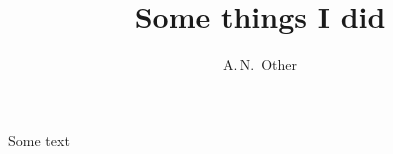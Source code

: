 \documentclass[titlepage]{paper}
\author{A.\,N.~Other}
\title{Some things I did}
\begin{document}
\maketitle
Some text
\end{document}
